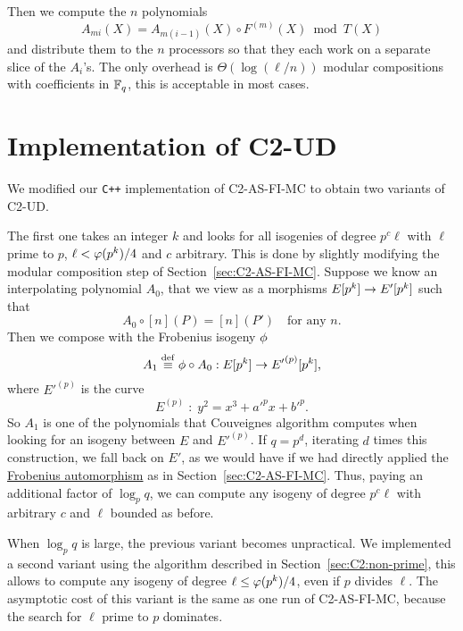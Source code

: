Then we compute the $n$ polynomials
\begin{equation*}
  A_{mi}(X) = A_{m(i-1)}(X) \circ F^{(m)}(X) \bmod T(X)
\end{equation*}
and distribute them to the $n$ processors so that they each work on a
separate slice of the $A_i$'s. The only overhead is $\Theta(\log
(\ell/n))$ modular compositions with coefficients in $\mathbb{F}_q$, this is
acceptable in most cases.

\section{Implementation of C2-UD}
\label{sec:implementation-c2-ud}
We modified our \texttt{C++} implementation of C2-AS-FI-MC to obtain
two variants of C2-UD.

The first one takes an integer $k$ and looks for all isogenies of
degree $p^c\ell$ with $\ell$ prime to $p$, $\ell<\varphi(p^k)/4$
and $c$ arbitrary. This is done by slightly modifying the modular
composition step of Section~\ref{sec:C2-AS-FI-MC}. Suppose we know an
interpolating polynomial $A_0$, that we view as a morphisms $E[p^k]\rightarrow
E'[p^k]$ such that
\begin{equation}
  \label{eq:184}
  A_0\circ[n](P) = [n](P')
  \quad\text{for any $n$.}
\end{equation}
Then we compose with the Frobenius isogeny $\phi$
\begin{equation}
  \label{eq:185}
  A_1 \overset{\mathrm{def}}{\equiv} \phi\circ A_0:E[p^k]\rightarrow {E'}^{(p)}[p^k]
  \text{,}
\end{equation}
where ${E'}^{(p)}$ is the curve
\begin{equation}
  \label{eq:186}
  E^{(p)}\;:\; y^2 = x^3+{a'}^px + {b}'^p
  \text{.}
\end{equation}
So $A_1$ is one of the polynomials that Couveignes algorithm computes
when looking for an isogeny between $E$ and ${E'}^{(p)}$. If $q=p^d$,
iterating $d$ times this construction, we fall back on $E'$, as we
would have if we had directly applied the
\hyperref[sec:curves-over-finite]{Frobenius automorphism} as in
Section~\ref{sec:C2-AS-FI-MC}. Thus, paying an additional factor of
$\log_p q$, we can compute any isogeny of degree $p^c\ell$ with
arbitrary $c$ and $\ell$ bounded as before.

When $\log_pq$ is large, the previous variant becomes unpractical. We
implemented a second variant using the algorithm described in
Section~\ref{sec:C2:non-prime}, this allows to compute any isogeny of
degree $\ell\le\varphi(p^k)/4$, even if $p$ divides $\ell$. The
asymptotic cost of this variant is the same as one run of C2-AS-FI-MC,
because the search for $\ell$ prime to $p$ dominates.



